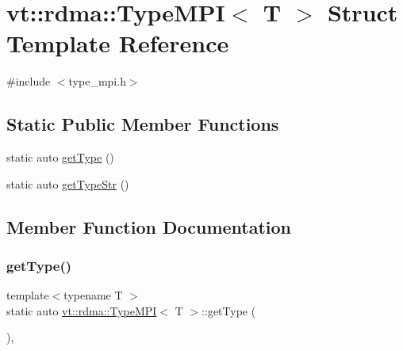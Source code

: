 \hypertarget{structvt_1_1rdma_1_1_type_m_p_i}{}\section{vt\+:\+:rdma\+:\+:Type\+M\+PI$<$ T $>$ Struct Template Reference}
\label{structvt_1_1rdma_1_1_type_m_p_i}


{\ttfamily \#include $<$type\+\_\+mpi.\+h$>$}

\subsection*{Static Public Member Functions}
\begin{DoxyCompactItemize}
\item 
static auto \hyperlink{structvt_1_1rdma_1_1_type_m_p_i_a5407234c820539dfae6bf411673cf6b5}{get\+Type} ()
\item 
static auto \hyperlink{structvt_1_1rdma_1_1_type_m_p_i_ab9b5939e91dfc8d6edd2cbafe0c76c6a}{get\+Type\+Str} ()
\end{DoxyCompactItemize}


\subsection{Member Function Documentation}
\mbox{\label{structvt_1_1rdma_1_1_type_m_p_i_a5407234c820539dfae6bf411673cf6b5}} 
\subsubsection{\texorpdfstring{get\+Type()}{getType()}}
{\footnotesize\ttfamily template$<$typename T $>$ \\
static auto \hyperlink{structvt_1_1rdma_1_1_type_m_p_i}{vt\+::rdma\+::\+Type\+M\+PI}$<$ T $>$\+::get\+Type (\begin{DoxyParamCaption}{ }\end{DoxyParamCaption})\hspace{0.3cm}{\ttfamily [inline]}, {\ttfamily [static]}}

\mbox{\label{structvt_1_1rdma_1_1_type_m_p_i_ab9b5939e91dfc8d6edd2cbafe0c76c6a}} 

